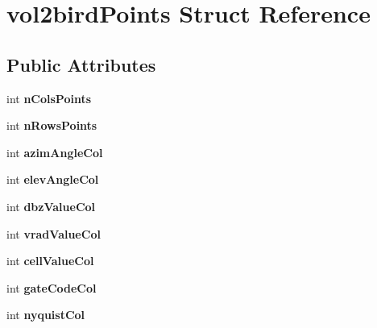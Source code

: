 \hypertarget{structvol2birdPoints}{}\section{vol2bird\+Points Struct Reference}
\label{structvol2birdPoints}
\subsection*{Public Attributes}
\begin{DoxyCompactItemize}
\item 
\mbox{\label{structvol2birdPoints_aa6597701f9ebc1658fc4877e46e7a13a}} 
int {\bfseries n\+Cols\+Points}
\item 
\mbox{\label{structvol2birdPoints_a98727add4df9d41ae269dbef760ebb95}} 
int {\bfseries n\+Rows\+Points}
\item 
\mbox{\label{structvol2birdPoints_ac5f605c37247bcc19e92521601310272}} 
int {\bfseries azim\+Angle\+Col}
\item 
\mbox{\label{structvol2birdPoints_ab44256f8b65e6c7d16765813a4f0e3be}} 
int {\bfseries elev\+Angle\+Col}
\item 
\mbox{\label{structvol2birdPoints_ab11f1d80f66e508eb3c0acad4a545d2c}} 
int {\bfseries dbz\+Value\+Col}
\item 
\mbox{\label{structvol2birdPoints_a138539ac2ef39c81e5e30ba7a8af6630}} 
int {\bfseries vrad\+Value\+Col}
\item 
\mbox{\label{structvol2birdPoints_ad55b06d3a6b3a41076a62a834eace222}} 
int {\bfseries cell\+Value\+Col}
\item 
\mbox{\label{structvol2birdPoints_aaa3b15cc4e7ed59c83bdbe3797504fee}} 
int {\bfseries gate\+Code\+Col}
\item 
\mbox{\label{structvol2birdPoints_a7794ad4ac0bbe35587a345eee1e87973}} 
int {\bfseries nyquist\+Col}
\item 
\mbox{\label{structvol2birdPoints_a6ccbd92030132c039151658751b2b0c3}} 

\end{DoxyCompactItemize}
